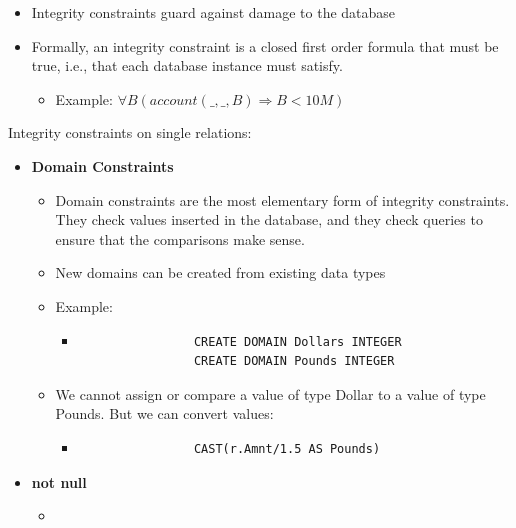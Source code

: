 \begin{itemize}[label=\(\rhd\)]
    \item Integrity constraints guard against damage to the database
    \item Formally, an integrity constraint is a closed first order formula that must be true, i.e., that each database instance must satisfy.
    \begin{itemize}[label=\(\rhd\)]
        \item Example: $\forall B(account(\_,\_,B) \Rightarrow B<10M)$
    \end{itemize}
\end{itemize}

Integrity constraints on single relations:
\begin{itemize}[label=\(\rhd\)]
    \item \textbf{Domain Constraints}
    \begin{itemize}[label=\(\rhd\)]
        \item Domain constraints are the most elementary form of integrity constraints. They check values inserted in the database, and they check queries to ensure that the comparisons make sense.
        \item New domains can be created from existing data types
        \item Example:
        \begin{itemize}[label=\(\rhd\)]
            \item[] \begin{lstlisting}
                CREATE DOMAIN Dollars INTEGER
                CREATE DOMAIN Pounds INTEGER
            \end{lstlisting}
        \end{itemize}
        \item We cannot assign or compare a value of type Dollar to a value of type Pounds. But we can convert values: 
        \begin{itemize}[label=\(\rhd\)]
            \item[] \begin{lstlisting}
                CAST(r.Amnt/1.5 AS Pounds)
            \end{lstlisting}
        \end{itemize}
    \end{itemize}
    \item \textbf{not null}
    \begin{itemize}[label=\(\rhd\)]
        \item[] \begin{lstlisting}

\end{lstlisting}
\end{itemize}
\end{itemize}
